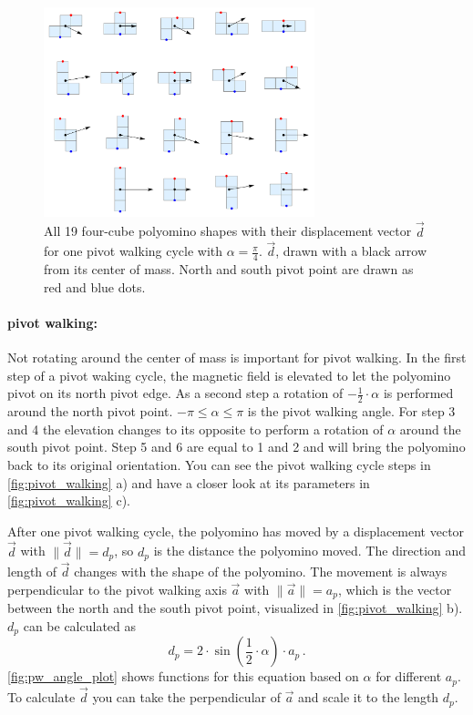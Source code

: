 \begin{figure}
	\centering
	\includegraphics[width=0.70\textwidth]{figures/displacement_pivot_walking.pdf}
	\caption[Polyomino shapes with different displacement vectors]{All 19 four-cube polyomino shapes with their displacement vector $\vec{d}$ for one pivot walking cycle with $\alpha = \frac{\pi}{4}$. $\vec{d}$, drawn with a black arrow from its center of mass. North and south pivot point are drawn as red and blue dots.}
	\label{fig:displacement_pivot_walking}
\end{figure}

\paragraph{pivot walking:}
Not rotating around the center of mass is important for pivot walking.
In the first step of a pivot waking cycle, the magnetic field is elevated to let the polyomino pivot on its north pivot edge.
As a second step a rotation of $-\frac{1}{2} \cdot \alpha$ is performed around the north pivot point.
$-\pi \leq \alpha \leq \pi$ is the pivot walking angle.
For step 3 and 4 the elevation changes to its opposite to perform a rotation of $\alpha$ around the south pivot point.
Step 5 and 6 are equal to 1 and 2 and will bring the polyomino back to its original orientation.
You can see the pivot walking cycle steps in \autoref{fig:pivot_walking} a) and have a closer look at its parameters in \autoref{fig:pivot_walking} c).

After one pivot walking cycle, the polyomino has moved by a displacement vector $\vec{d}$ with $\lVert \vec{d} \rVert = d_p$, so $d_p$ is the distance the polyomino moved.
The direction and length of $\vec{d}$ changes with the shape of the polyomino.
The movement is always perpendicular to the pivot walking axis $\vec{a}$ with $\lVert \vec{a} \rVert = a_p$, which is the vector between the north and the south pivot point, visualized in \autoref{fig:pivot_walking} b).
$d_p$ can be calculated as
\begin{equation}
d_p = 2 \cdot \sin\left(\frac{1}{2} \cdot \alpha \right) \cdot a_p \,.
\end{equation}
\autoref{fig:pw_angle_plot} shows functions for this equation based on $\alpha$ for different $a_p$.
To calculate $\vec{d}$ you can take the perpendicular of $\vec{a}$ and scale it to the length $d_p$.

